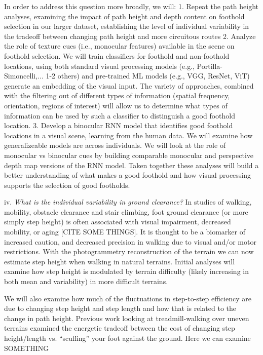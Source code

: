 In order to address this question more broadly, we will: 1. Repeat the path height analyses, examining the impact of path height and depth content on foothold selection in our larger dataset, establishing the level of individual variability in the tradeoff between changing path height and more circuitous routes 2. Analyze the role of texture cues (i.e., monocular features) available in the scene on foothold selection. We will train classifiers for foothold and non-foothold locations, using both standard visual processing models (e.g., Portilla-Simoncelli,... 1-2 others) and pre-trained ML models (e.g., VGG, ResNet, ViT) generate an embedding of the visual input. The variety of approaches, combined with the filtering out of different types of information (spatial frequency, orientation, regions of interest) will allow us to determine what types of information can be used by such a classifier to distinguish a good foothold location. 3. Develop a binocular RNN model that identifies good foothold locations in a visual scene, learning from the human data. We will examine how generalizeable models are across individuals. We will look at the role of monocular vs binocular cues by building comparable monocular and perspective depth map versions of the RNN model. Taken together these analyses will build a better understanding of what makes a good foothold and how visual processing supports the selection of good footholds.

iv. \emph{What is the individual variability in ground clearance?} In studies of walking, mobility, obstacle clearance and stair climbing, foot ground clearance (or more simply step height) is often associated with visual impairment, decreased mobility, or aging [CITE SOME THINGS]. It is thought to be a biomarker of increased caution, and decreased precision in walking due to visual and/or motor restrictions. With the photogrammetry reconstruction of the terrain we can now estimate step height when walking in natural terrains. Initial analyses will examine how step height is modulated by terrain difficulty (likely increasing in both mean and variability) in more difficult terrains.

We will also examine how much of the fluctuations in step-to-step
efficiency are due to changing step height and step length and how that is related to the change in path height. Previous work looking at treadmill-walking over uneven terrains examined the energetic tradeoff between the cost of changing step height/length vs. ``scuffing'' your foot against the ground. Here we can examine SOMETHING


